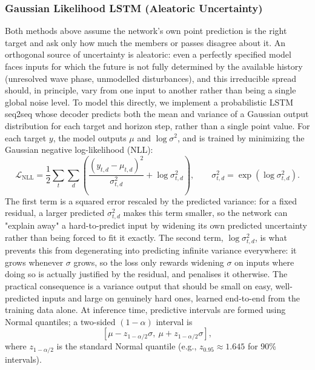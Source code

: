\documentclass[a4paper,fleqn]{cas-sc}
\begin{document}
\subsubsection{Gaussian Likelihood LSTM (Aleatoric Uncertainty)}
\label{sec:gaussian-method}

Both methods above assume the network's own point prediction is the right target and ask only how much the members or passes disagree about it. An orthogonal source of uncertainty is aleatoric: even a perfectly specified model faces inputs for which the future is not fully determined by the available history (unresolved wave phase, unmodelled disturbances), and this irreducible spread should, in principle, vary from one input to another rather than being a single global noise level. To model this directly, we implement a probabilistic LSTM seq2seq whose decoder predicts both the mean and variance of a Gaussian output distribution for each target and horizon step, rather than a single point value. For each target $y$, the model outputs $\mu$ and $\log \sigma^2$, and is trained by minimizing the Gaussian negative log-likelihood (NLL):
\[
\mathcal{L}_{\mathrm{NLL}} =
\frac{1}{2}\sum_{t}\sum_{d}
\left(
\frac{(y_{t,d}-\mu_{t,d})^2}{\sigma_{t,d}^2} + \log \sigma_{t,d}^2
\right),
\qquad \sigma_{t,d}^2 = \exp(\log \sigma_{t,d}^2).
\]
The first term is a squared error rescaled by the predicted variance: for a fixed residual, a larger predicted $\sigma_{t,d}^2$ makes this term smaller, so the network can "explain away" a hard-to-predict input by widening its own predicted uncertainty rather than being forced to fit it exactly. The second term, $\log\sigma_{t,d}^2$, is what prevents this from degenerating into predicting infinite variance everywhere: it grows whenever $\sigma$ grows, so the loss only rewards widening $\sigma$ on inputs where doing so is actually justified by the residual, and penalises it otherwise. The practical consequence is a variance output that should be small on easy, well-predicted inputs and large on genuinely hard ones, learned end-to-end from the training data alone. At inference time, predictive intervals are formed using Normal quantiles; a two-sided $(1-\alpha)$ interval is
\[
[\mu - z_{1-\alpha/2}\sigma,\ \mu + z_{1-\alpha/2}\sigma],
\]
where $z_{1-\alpha/2}$ is the standard Normal quantile (e.g., $z_{0.95}\approx 1.645$ for 90\% intervals).
\end{document}
